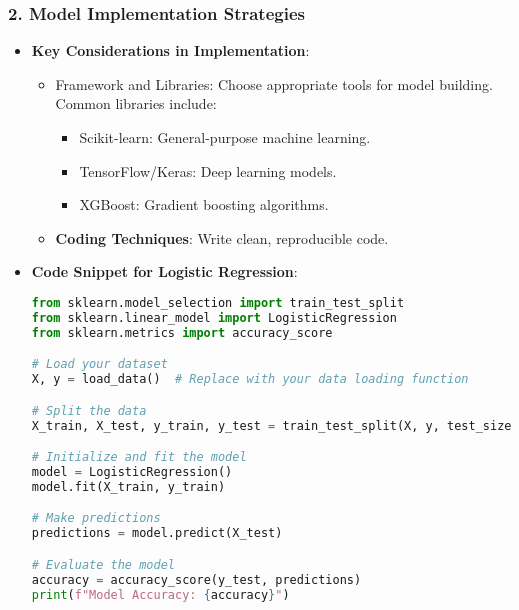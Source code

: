 \documentclass[aspectratio=169]{beamer}
\begin{document}
\begin{frame}[fragile]
    \frametitle{2. Model Implementation Strategies}
    \begin{itemize}
        \item \textbf{Key Considerations in Implementation}:
        \begin{itemize}
            \item Framework and Libraries: Choose appropriate tools for model building. Common libraries include:
            \begin{itemize}
                \item Scikit-learn: General-purpose machine learning.
                \item TensorFlow/Keras: Deep learning models.
                \item XGBoost: Gradient boosting algorithms.
            \end{itemize}
            \item \textbf{Coding Techniques}: Write clean, reproducible code. 
        \end{itemize}
        
        \item \textbf{Code Snippet for Logistic Regression}:
        \begin{lstlisting}[language=Python]
from sklearn.model_selection import train_test_split
from sklearn.linear_model import LogisticRegression
from sklearn.metrics import accuracy_score

# Load your dataset
X, y = load_data()  # Replace with your data loading function

# Split the data
X_train, X_test, y_train, y_test = train_test_split(X, y, test_size=0.2, random_state=42)

# Initialize and fit the model
model = LogisticRegression()
model.fit(X_train, y_train)

# Make predictions
predictions = model.predict(X_test)

# Evaluate the model
accuracy = accuracy_score(y_test, predictions)
print(f"Model Accuracy: {accuracy}")
        \end{lstlisting}
    \end{itemize}
\end{frame}
\end{document}
